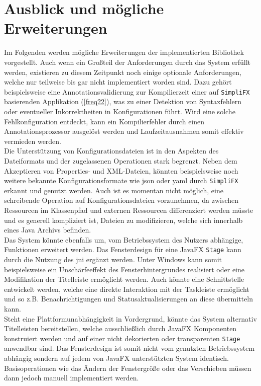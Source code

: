 \section{Ausblick und mögliche Erweiterungen}
\label{ausblick_und_mögliche_erweiterungen}
Im Folgenden werden mögliche Erweiterungen der implementierten Bibliothek vorgestellt. Auch wenn ein Großteil der Anforderungen durch das System erfüllt werden, existieren zu diesem Zeitpunkt noch einige optionale Anforderungen, welche nur teilweise bis gar nicht implementiert worden sind. Dazu gehört beispielsweise eine Annotationsvalidierung zur Kompilierzeit einer auf \texttt{SimpliFX} basierenden Applikation (\autoref{freq22}), was zu einer Detektion von Syntaxfehlern oder eventueller Inkorrektheiten in Konfigurationen führt. Wird eine solche Fehlkonfiguration entdeckt, kann ein Kompilierfehler durch einen Annotationsprozessor ausgelöst werden und Laufzeitausnahmen somit effektiv vermieden werden.\\
Die Unterstützung von Konfigurationsdateien ist in den Aspekten des Dateiformats und der zugelassenen Operationen stark begrenzt. Neben dem Akzeptieren von Properties- und XML-Dateien, könnten beispielsweise noch weitere bekannte Konfigurationsformate wie \ac{json} oder \ac{yaml} durch \texttt{SimpliFX} erkannt und genutzt werden. Auch ist es momentan nicht möglich, eine schreibende Operation auf Konfigurationsdateien vorzunehmen, da zwischen Ressourcen im Klassenpfad und externen Ressourcen differenziert werden müsste und es generell kompliziert ist, Dateien zu modifizieren, welche sich innerhalb eines Java Archivs befinden.\\
Das System könnte ebenfalls um, vom Betriebssystem des Nutzers abhängige, Funktionen erweitert werden. Das Fensterdesign für eine JavaFX \texttt{Stage} kann durch die Nutzung des \ac{jni} ergänzt werden. Unter Windows kann somit beispielsweise ein Unschärfeeffekt des Fensterhintergrundes realisiert oder eine Modifikation der Titelleiste ermöglicht werden. Auch könnte eine Schnittstelle entwickelt werden, welche eine direkte Interaktion mit der Taskleiste ermöglicht und so z.B. Benachrichtigungen und Statusaktualisierungen an diese übermitteln kann.\\
Steht eine Plattformunabhängigkeit in Vordergrund, könnte das System alternativ Titelleisten bereitstellen, welche ausschließlich durch JavaFX Komponenten konstruiert werden und auf einer nicht dekorierten oder transparenten \texttt{Stage} anwendbar sind. Das Fensterdesign ist somit nicht vom genutzten Betriebssystem abhängig sondern auf jedem von JavaFX unterstützten System identisch. Basisoperationen wie das Ändern der Fenstergröße oder das Verschieben müssen dann jedoch manuell implementiert werden.\\
